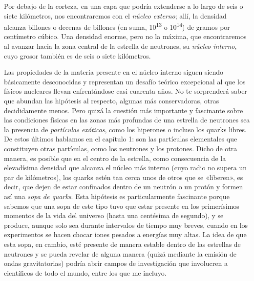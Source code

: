 Por debajo de la corteza, en una capa que podría extenderse a lo largo de seis o siete kilómetros, nos encontraremos con el \emph{núcleo externo}; allí, la densidad alcanza billones o decenas de billones (en suma, 10\textsuperscript{13} o 10\textsuperscript{14}) de gramos por centímetro cúbico. Una densidad enorme, pero no la máxima, que encontraremos al avanzar hacia la zona central de la estrella de neutrones, su \emph{núcleo interno}, cuyo grosor también es de seis o siete kilómetros.

Las propiedades de la materia presente en el núcleo interno siguen siendo básicamente desconocidas y representan un desafío teórico excepcional al que los físicos nucleares llevan enfrentándose casi cuarenta años. No te sorprenderá saber que abundan las hipótesis al respecto, algunas más conservadoras, otras decididamente menos. Pero quizá la cuestión más importante y fascinante sobre las condiciones físicas en las zonas más profundas de una estrella de neutrones sea la presencia de \emph{partículas exóticas}, como los hiperones o incluso los quarks libres. De estos últimos hablamos en el capítulo 1: son las partículas elementales que constituyen otras partículas, como los neutrones y los protones. Dicho de otra manera, es posible que en el centro de la estrella, como consecuencia de la elevadísima densidad que alcanza el núcleo más interno (cuyo radio no supera un par de kilómetros), los quarks estén tan cerca unos de otros que se «liberen», es decir, que dejen de estar confinados dentro de un neutrón o un protón y formen así una \emph{sopa de quarks}. Esta hipótesis es particularmente fascinante porque sabemos que una sopa de este tipo tuvo que estar presente en los primerísimos momentos de la vida del universo (hasta una centésima de segundo), y se produce, aunque solo sea durante intervalos de tiempo muy breves, cuando en los experimentos se hacen chocar iones pesados a energías muy altas. La idea de que esta sopa, en cambio, esté presente de manera estable dentro de las estrellas de neutrones y se pueda revelar de alguna manera (quizá mediante la emisión de ondas gravitatorias) podría abrir campos de investigación que involucren a científicos de todo el mundo, entre los que me incluyo.

